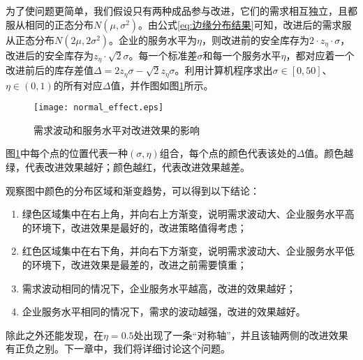 为了使问题更简单，我们假设只有两种成品参与改进，它们的需求相互独立，且都服从相同的正态分布$N(\mu,\sigma^2)$。由公式\ref{eq:边缘分布结果}可知，改进后的需求服从正态分布$N(2\mu,2\sigma^2)$。企业的服务水平为$\eta$，则改进前的安全库存为$2\cdot z_{\eta}\cdot\sigma$，改进后的安全库存为$z_{\eta}\cdot\sqrt{2}\sigma$。每一个标准差$\sigma$和每一个服务水平$\eta$，都对应着一个改进前后的库存差值$\Delta=2z_{\eta}\sigma-\sqrt{2}z_{\eta}\sigma$。利用计算机程序求出$\sigma\in[0,50]$、$\eta\in(0,1)$的所有对应$\Delta$值，并作图如图\ref{fig:需求波动和服务水平对改进效果的影响}所示。

\begin{figure}[htb]
\centering
\texttt{[image: normal\_effect.eps]}
\caption{需求波动和服务水平对改进效果的影响}
\label{fig:需求波动和服务水平对改进效果的影响}
\end{figure}

图\ref{fig:需求波动和服务水平对改进效果的影响}中每个点的位置代表一种$(\sigma,\eta)$组合，每个点的颜色代表该处的$\Delta$值。颜色越绿，代表改进效果越好；颜色越红，代表改进效果越差。

观察图中颜色的分布区域和渐变趋势，可以得到以下结论：
\begin{enumerate}
\item 绿色区域集中在右上角，并向右上方渐变，说明需求波动大、企业服务水平高的环境下，改进效果是最好的，改进策略值得考虑；
\item 红色区域集中在右下角，并向右下方渐变，说明需求波动大、企业服务水平低的环境下，改进效果是最差的，改进之前需要慎重；
\item 需求波动相同的情况下，企业服务水平越高，改进的效果越好；
\item 企业服务水平相同的情况下，需求的波动越强，改进的效果越好。
\end{enumerate}

除此之外还能发现，在$\eta=0.5$处出现了一条“对称轴”，并且该轴两侧的改进效果有正负之别。下一章中，我们将详细讨论这个问题。










